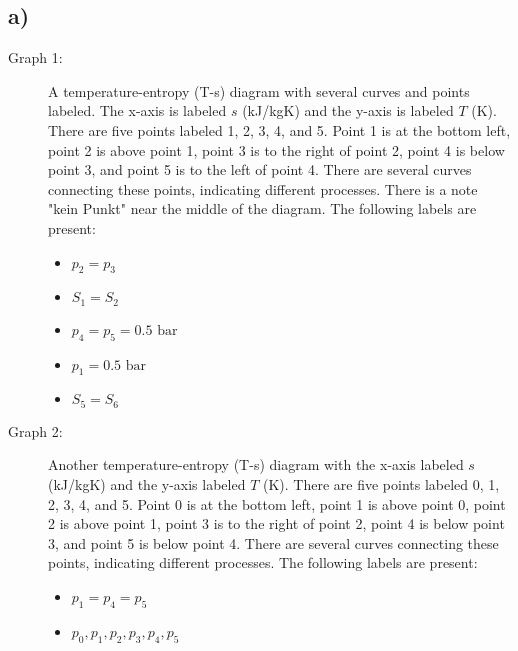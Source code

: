 

\subsection*{a)}

\begin{description}
    \item[Graph 1:] A temperature-entropy (T-s) diagram with several curves and points labeled. The x-axis is labeled $s$ (kJ/kgK) and the y-axis is labeled $T$ (K). There are five points labeled 1, 2, 3, 4, and 5. Point 1 is at the bottom left, point 2 is above point 1, point 3 is to the right of point 2, point 4 is below point 3, and point 5 is to the left of point 4. There are several curves connecting these points, indicating different processes. There is a note "kein Punkt" near the middle of the diagram. The following labels are present:
    \begin{itemize}
        \item $p_2 = p_3$
        \item $S_1 = S_2$
        \item $p_4 = p_5 = 0.5 \text{ bar}$
        \item $p_1 = 0.5 \text{ bar}$
        \item $S_5 = S_6$
    \end{itemize}
\end{description}

\begin{description}
    \item[Graph 2:] Another temperature-entropy (T-s) diagram with the x-axis labeled $s$ (kJ/kgK) and the y-axis labeled $T$ (K). There are five points labeled 0, 1, 2, 3, 4, and 5. Point 0 is at the bottom left, point 1 is above point 0, point 2 is above point 1, point 3 is to the right of point 2, point 4 is below point 3, and point 5 is below point 4. There are several curves connecting these points, indicating different processes. The following labels are present:
    \begin{itemize}
        \item $p_1 = p_4 = p_5$
        \item $p_0, p_1, p_2, p_3, p_4, p_5$
    \end{itemize}
\end{description}